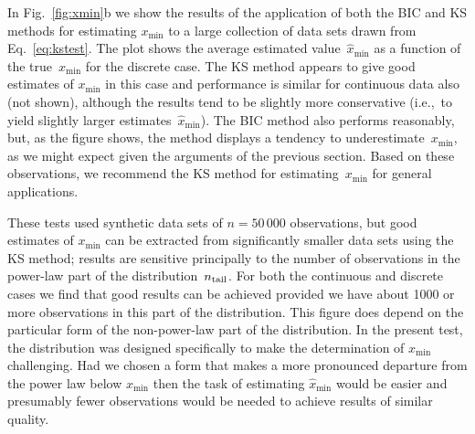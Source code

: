 \documentclass[final]{siamltex}
\newcommand{\xmin}{\ensuremath{x_{\min}}}
\newcommand{\ntail}{\ensuremath{n_{\rm tail}}}
\begin{document}
In Fig.~\ref{fig:xmin}b we show the results of the application of both the
BIC and KS methods for estimating $\xmin$ to a large collection of data
sets drawn from Eq.~\eqref{eq:kstest}.  The plot shows the average
estimated value~$\hat{x}_{\min}$ as a function of the true~$\xmin$ for the
discrete case.  The KS method appears to give good estimates of $\xmin$ in
this case and performance is similar for continuous data also (not shown),
although the results tend to be slightly more conservative (i.e.,~to yield
slightly larger estimates~$\hat{x}_{\min}$).  The BIC method also performs
reasonably, but, as the figure shows, the method displays a tendency to
underestimate~$\xmin$, as we might expect given the arguments of the
previous section.  Based on these observations, we recommend the KS method
for estimating~$\xmin$ for general applications.

These tests used synthetic data sets of $n=50\,000$ observations, but good
estimates of $\xmin$ can be extracted from significantly smaller data sets
using the KS method; results are sensitive principally to the number of
observations in the power-law part of the distribution~$\ntail$.  For both
the continuous and discrete cases we find that good results can be achieved
provided we have about 1000 or more observations in this part of the
distribution.  This figure does depend on the particular form of the
non-power-law part of the distribution.  In the present test, the
distribution was designed specifically to make the determination of $\xmin$
challenging.  Had we chosen a form that makes a more pronounced departure
from the power law below $\xmin$ then the task of estimating
$\hat{x}_{\min}$ would be easier and presumably fewer observations would be
needed to achieve results of similar quality.

\end{document}
